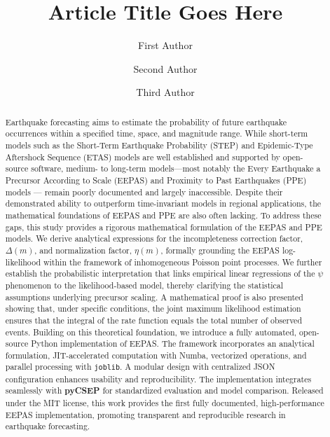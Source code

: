 \documentclass[linenum,doublespace,onecolumn]{SSA-SRL}
\theoremstyle{lemma}
\begin{document}
\title{Article Title Goes Here}

\author[*1\orc{0000-0000-0000-0001}]{First Author}
\author[1\orc{0000-0000-0000-0002}]{Second Author}
\author[2\orc{0000-0000-0000-0003}]{Third Author}



\begin{abstract}
Earthquake forecasting aims to estimate the probability of future earthquake occurrences within a specified time, space, and magnitude range. While short-term models such as the Short-Term Earthquake Probability (STEP) and Epidemic-Type Aftershock Sequence (ETAS) models are well established and supported by open-source software, medium- to long-term models—most notably the Every Earthquake a Precursor According to Scale (EEPAS) and Proximity to Past Earthquakes (PPE) models — remain poorly documented and largely inaccessible. Despite their demonstrated ability to outperform time-invariant models in regional applications, the mathematical foundations of EEPAS and PPE are also often lacking. To address these gaps, this study provides a rigorous mathematical formulation of the EEPAS and PPE models. We derive analytical expressions for the incompleteness correction factor, $\Delta(m)$, and normalization factor, $\eta(m)$, formally grounding the EEPAS log-likelihood within the framework of inhomogeneous Poisson point processes. We further establish the probabilistic interpretation that links empirical linear regressions of the $\psi$ phenomenon to the likelihood-based model, thereby clarifying the statistical assumptions underlying precursor scaling. A mathematical proof is also presented showing that, under specific conditions, the joint maximum likelihood estimation ensures that the integral of the rate function equals the total number of observed events. Building on this theoretical foundation, we introduce a fully automated, open-source Python implementation of EEPAS. The framework incorporates an analytical formulation, JIT-accelerated computation with Numba, vectorized operations, and parallel processing with \texttt{joblib}. A modular design with centralized JSON configuration enhances usability and reproducibility. The implementation integrates seamlessly with \textbf{pyCSEP} for standardized evaluation and model comparison. Released under the MIT license, this work provides the first fully documented, high-performance EEPAS implementation, promoting transparent and reproducible research in earthquake forecasting.

\end{abstract}
\end{document}
